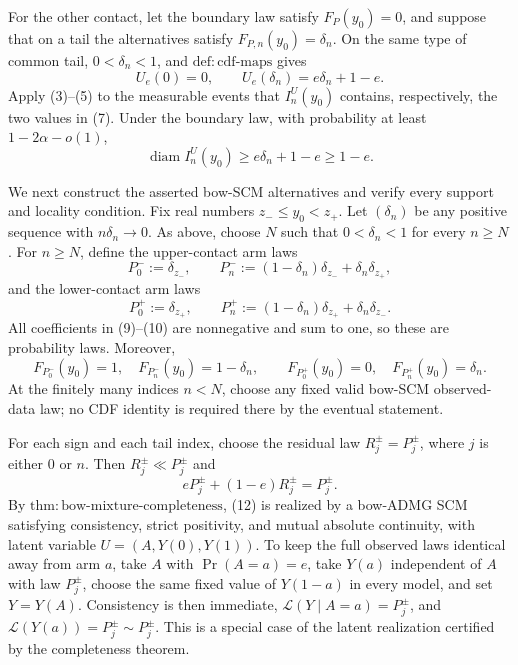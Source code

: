 For the other contact, let the boundary law satisfy \(F_P(y_0)=0\), and suppose that on a tail the alternatives satisfy \(F_{P,n}(y_0)=\delta_n\). On the same type of common tail, \(0<\delta_n<1\), and \(\mathrm{def:cdf\text{-}maps}\) gives
\[
 U_e(0)=0,
 \qquad
 U_e(\delta_n)=e\delta_n+1-e.
 \tag{7}
\]
Apply (3)--(5) to the measurable events that \(I_n^U(y_0)\) contains, respectively, the two values in (7). Under the boundary law, with probability at least \(1-2\alpha-o(1)\),
\[
 \operatorname{diam} I_n^U(y_0)
 \ge e\delta_n+1-e
 \ge1-e.
 \tag{8}
\]

We next construct the asserted bow-SCM alternatives and verify every support and locality condition. Fix real numbers \(z_-\le y_0<z_+\). Let \((\delta_n)\) be any positive sequence with \(n\delta_n\to0\). As above, choose \(N\) such that \(0<\delta_n<1\) for every \(n\ge N\). For \(n\ge N\), define the upper-contact arm laws
\[
 P_0^-:=\delta_{z_-},
 \qquad
 P_n^-:=(1-\delta_n)\delta_{z_-}+\delta_n\delta_{z_+},
 \tag{9}
\]
and the lower-contact arm laws
\[
 P_0^+:=\delta_{z_+},
 \qquad
 P_n^+:=(1-\delta_n)\delta_{z_+}+\delta_n\delta_{z_-}.
 \tag{10}
\]
All coefficients in (9)--(10) are nonnegative and sum to one, so these are probability laws. Moreover,
\[
 F_{P_0^-}(y_0)=1,
 \quad F_{P_n^-}(y_0)=1-\delta_n,
 \qquad
 F_{P_0^+}(y_0)=0,
 \quad F_{P_n^+}(y_0)=\delta_n.
 \tag{11}
\]
At the finitely many indices \(n<N\), choose any fixed valid bow-SCM observed-data law; no CDF identity is required there by the eventual statement.

For each sign and each tail index, choose the residual law \(R_j^\pm=P_j^\pm\), where \(j\) is either \(0\) or \(n\). Then \(R_j^\pm\ll P_j^\pm\) and
\[
 eP_j^\pm+(1-e)R_j^\pm=P_j^\pm.
 \tag{12}
\]
By \(\mathrm{thm:bow\text{-}mixture\text{-}completeness}\), (12) is realized by a bow-ADMG SCM satisfying consistency, strict positivity, and mutual absolute continuity, with latent variable \(U=(A,Y(0),Y(1))\). To keep the full observed laws identical away from arm \(a\), take \(A\) with \(\Pr(A=a)=e\), take \(Y(a)\) independent of \(A\) with law \(P_j^\pm\), choose the same fixed value of \(Y(1-a)\) in every model, and set \(Y=Y(A)\). Consistency is then immediate, \(\mathcal L(Y\mid A=a)=P_j^\pm\), and \(\mathcal L(Y(a))=P_j^\pm\sim P_j^\pm\). This is a special case of the latent realization certified by the completeness theorem.

